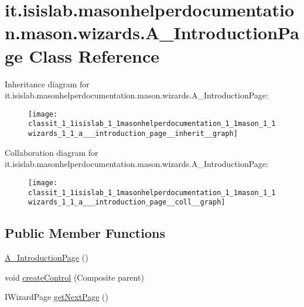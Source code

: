 \hypertarget{classit_1_1isislab_1_1masonhelperdocumentation_1_1mason_1_1wizards_1_1_a___introduction_page}{\section{it.\-isislab.\-masonhelperdocumentation.\-mason.\-wizards.\-A\-\_\-\-Introduction\-Page Class Reference}
\label{classit_1_1isislab_1_1masonhelperdocumentation_1_1mason_1_1wizards_1_1_a___introduction_page}
}


Inheritance diagram for it.\-isislab.\-masonhelperdocumentation.\-mason.\-wizards.\-A\-\_\-\-Introduction\-Page\-:
\nopagebreak
\begin{figure}[H]
\begin{center}
\leavevmode
\texttt{[image: classit\_1\_1isislab\_1\_1masonhelperdocumentation\_1\_1mason\_1\_1wizards\_1\_1\_a\_\_\_introduction\_page\_\_inherit\_\_graph]}
\end{center}
\end{figure}


Collaboration diagram for it.\-isislab.\-masonhelperdocumentation.\-mason.\-wizards.\-A\-\_\-\-Introduction\-Page\-:
\nopagebreak
\begin{figure}[H]
\begin{center}
\leavevmode
\texttt{[image: classit\_1\_1isislab\_1\_1masonhelperdocumentation\_1\_1mason\_1\_1wizards\_1\_1\_a\_\_\_introduction\_page\_\_coll\_\_graph]}
\end{center}
\end{figure}
\subsection*{Public Member Functions}
\begin{DoxyCompactItemize}
\item 
\hyperlink{classit_1_1isislab_1_1masonhelperdocumentation_1_1mason_1_1wizards_1_1_a___introduction_page_a0ad4b7c0d0d63d7408d41ae0ea64cc74}{A\-\_\-\-Introduction\-Page} ()
\item 
void \hyperlink{classit_1_1isislab_1_1masonhelperdocumentation_1_1mason_1_1wizards_1_1_a___introduction_page_ab2150ace9b2c3717fafb9880f1078e17}{create\-Control} (Composite parent)
\item 
I\-Wizard\-Page \hyperlink{classit_1_1isislab_1_1masonhelperdocumentation_1_1mason_1_1wizards_1_1_a___introduction_page_a2cf283c12319487dc35d2bb428327133}{get\-Next\-Page} ()
\end{DoxyCompactItemize}
